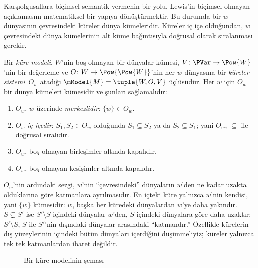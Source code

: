 \documentclass[../../../include/open-logic-section]{subfiles}
\begin{document}


Karşıolgusallara biçimsel semantik vermenin bir yolu, Lewis'in biçimsel
olmayan açıklamasını matematiksel bir yapıya dönüştürmektir. Bu durumda bir
$w$ dünyasının çevresindeki küreler dünya kümeleridir. Küreler iç içe
olduğundan, $w$ çevresindeki dünya kümelerinin alt küme bağıntısıyla doğrusal
olarak sıralanması gerekir.

\begin{defn}
  Bir \emph{küre modeli}, $W$'nin boş olmayan bir dünyalar kümesi,
  $V\colon\PVar\to\Pow{W}$'nin bir değerleme ve
  $O\colon W\to\Pow{\Pow{W}}$'nin her $w$ dünyasına bir
  \emph{küreler sistemi}~$O_w$ atadığı $\mModel{M}=\tuple{W,O,V}$
  üçlüsüdür. Her $w$ için $O_w$ bir dünya kümeleri kümesidir ve şunları
  sağlamalıdır:
  \begin{enumerate}
  \item $O_w$, $w$ üzerinde \emph{merkezlidir}: $\{w\}\in O_w$.
  \item $O_w$ \emph{iç içedir}: $S_1,S_2\in O_w$ olduğunda
    $S_1\subseteq S_2$ ya da $S_2\subseteq S_1$; yani $O_w$,
    $\subseteq$ ile doğrusal sıralıdır.
  \item $O_w$, boş olmayan birleşimler altında kapalıdır.
  \item $O_w$, boş olmayan kesişimler altında kapalıdır.
  \end{enumerate}
\end{defn}

$O_w$'nin ardındaki sezgi, $w$'nin ``çevresindeki'' dünyaların $w$'den ne
kadar uzakta olduklarına göre katmanlara ayrılmasıdır. En içteki küre yalnızca
$w$'nin kendisi, yani $\{w\}$ kümesidir: $w$, başka her küredeki dünyalardan
$w$'ye daha yakındır. $S\subsetneq S'$ ise $S'\setminus S$ içindeki dünyalar
$w$'den, $S$ içindeki dünyalara göre daha uzaktır: $S'\setminus S$, $S$ ile
$S'$'nin dışındaki dünyalar arasındaki ``katmandır.'' Özellikle kürelerin dış
yüzeylerinin içindeki bütün dünyaları içerdiğini düşünmeliyiz; küreler yalnızca
tek tek katmanlardan ibaret değildir.

\begin{figure}
\begin{center}
\caption{Bir küre modelinin şeması}
\end{center}
\end{figure}
\end{document}
